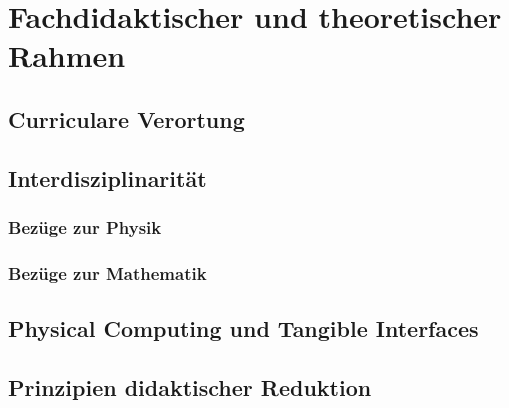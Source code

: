 \chapter{Fachdidaktischer und theoretischer Rahmen}\label{chap:fachdidaktischer-rahmen}

\section{Curriculare Verortung}\label{sec:curriculare-verortung}

\section{Interdisziplinarität}\label{sec:interdisziplinaritaet}

\subsection{Bezüge zur Physik}\label{subsec:bezuege-physik}

\subsection{Bezüge zur Mathematik}\label{subsec:bezuege-mathematik}

\section{Physical Computing und Tangible Interfaces}\label{sec:physical-computing}

\section{Prinzipien didaktischer Reduktion}\label{sec:didaktische-reduktion}
